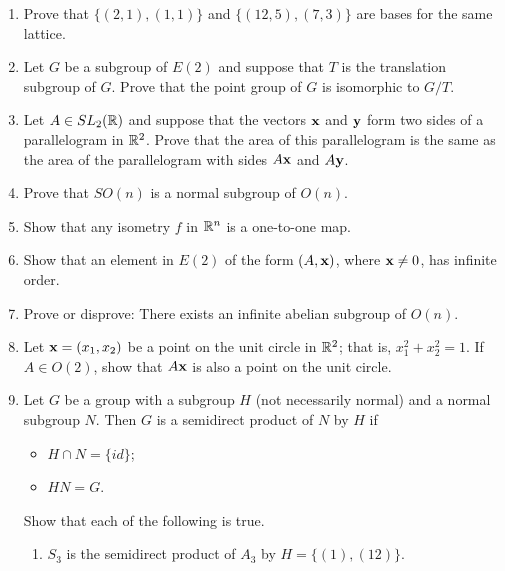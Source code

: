 {\begin{enumerate}
 
\bf\item\rm
Prove that $\{ (2,1), (1,1) \}$  and $\{ ( 12, 5), ( 7, 3) \}$ are bases
for the same lattice. 
 
 
\bf\item\rm
Let $G$ be a subgroup of $E(2)$ and suppose that $T$ is the
translation subgroup of $G$.  Prove that the point group of $G$ is
isomorphic to $G/T$. 
 
 
\bf\item\rm
Let $A \in SL_2({\Bbb R})$ and suppose that the vectors ${\bold x}$
and ${\bold y}$ form two sides of a parallelogram in ${\Bbb R}^2$.
Prove that the area of this parallelogram is the same as the area of
the parallelogram with sides $A{\bold x}$ and $A{\bold y}$. 
 
 
\bf\item\rm
Prove that $SO(n)$ is a normal subgroup of $O(n)$.
 
 
\bf\item\rm
Show that any isometry $f$ in ${\Bbb R}^n$ is a one-to-one map.
 
 
\bf\item\rm
Show that an element in $E(2)$ of the form $(A, {\bold x})$,
where ${\bold x} \neq 0$, has infinite order.
 
 
\bf\item\rm
Prove or disprove: There exists an infinite abelian subgroup of 
$O(n)$.
 
 
\bf\item\rm
Let ${\bold x} = (x_1, x_2)$ be a point on the unit circle in ${\Bbb
R}^2$; that is, $x_1^2 + x_2^2 = 1$. If $A \in O(2)$, show that $A
{\bold x}$ is also a point on the unit circle. 
 
 
 
\bf\item\rm
Let $G$ be a group with a subgroup $H$ (not necessarily normal) and a
normal subgroup $N$. Then $G$ is a {\bfi semidirect
product\/} of $N$ by $H$ if  
\begin{itemize}
 
 \item
$H \cap N = \{ id \}$;
 
 \item
$HN=G$.
 
\end{itemize}
Show that each of the following is true.
\begin{enumerate}
 
 \bf\item\rm
$S_3$ is the semidirect product of $A_3$ by $H = \{(1), (12) \}$.
 

\end{enumerate}
\end{enumerate}}
